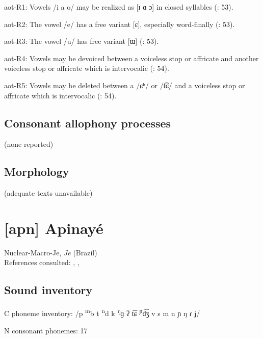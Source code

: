 {\begin{appendixdesc}
\item[aot-R1:] Vowels /i a o/ may be realized as [ɪ ɑ ɔ] in closed syllables (\citealt{VanBreugel2008}: 53).

\item[aot-R2:] The vowel /e/ has a free variant [ɛ], especially word-finally (\citealt{VanBreugel2008}: 53).

\item[aot-R3:] The vowel /u/ has free variant [ɯ] (\citealt{VanBreugel2008}: 53).

\item[aot-R4:] Vowels may be devoiced between a voiceless stop or affricate and another voiceless stop or affricate which is intervocalic (\citealt{VanBreugel2008}: 54).

\item[aot-R5:] Vowels may be deleted between a /ɕʰ/ or /t͡ɕ/ and a voiceless stop or affricate which is intervocalic (\citealt{VanBreugel2008}: 54).
\end{appendixdesc}
\subsection*{Consonant allophony processes}
(none reported)

\subsection*{Morphology}
(adequate texts unavailable)

\section*{[apn] Apinayé}   %
Nuclear-Macro-Je, \textit{Je} (Brazil)\medskip\\
References consulted: \citet{BurgessHam1968}, \citet{Ham2009},  \citet{CunhadeOliveira2005}

\subsection*{Sound inventory}
\begin{appendixdesc}

\item[C phoneme inventory:] /p \textsuperscript{m}b t \textsuperscript{n}d k \textsuperscript{ŋ}ɡ ʔ t͡ɕ \textsuperscript{ɲ}d͡ʒ v s m n ɲ ŋ ɾ j/

\item[N consonant phonemes:] 17


\end{appendixdesc}}

